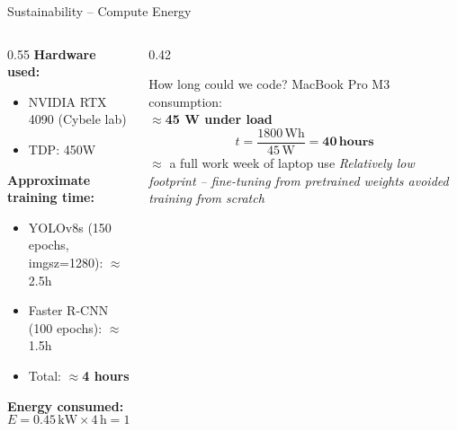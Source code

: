 \documentclass[aspectratio=169]{beamer}
\begin{document}
\begin{frame}{Sustainability -- Compute Energy}
  \begin{columns}
    \begin{column}{0.55\textwidth}
      \textbf{Hardware used:}
      \begin{itemize}
        \item NVIDIA RTX 4090 (Cybele lab)
        \item TDP: 450W
      \end{itemize}
      \vspace{0.5em}
      \textbf{Approximate training time:}
      \begin{itemize}
        \item YOLOv8s (150 epochs, imgsz=1280): $\approx$2.5h
        \item Faster R-CNN (100 epochs): $\approx$1.5h
        \item Total: $\approx$\textbf{4 hours}
      \end{itemize}
      \vspace{0.5em}
      \textbf{Energy consumed:}
      \[E = 0.45\,\text{kW} \times 4\,\text{h} = \mathbf{1.8\,\text{kWh}}\]
    \end{column}
    \begin{column}{0.42\textwidth}
      \begin{block}{How long could we code?}
        \vspace{0.3em}
        MacBook Pro M3 consumption:\\
        \textbf{$\approx$45 W under load}
        \vspace{0.5em}
        \[t = \frac{1800\,\text{Wh}}{45\,\text{W}} = \mathbf{40\,\text{hours}}\]
        \vspace{0.3em}
        \centering
        $\approx$ a full work week of laptop use
        \vspace{0.3em}
        \textit{Relatively low footprint -- fine-tuning from pretrained weights avoided training from scratch}
      \end{block}
    \end{column}
  \end{columns}
\end{frame}
\end{document}
